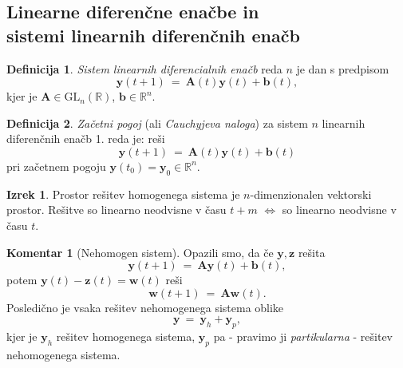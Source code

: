 \documentclass[11pt]{article}
\newcommand{\R}{\mathbb{R}}
\renewcommand{\b}{\mathbf{b}}
\newcommand{\y}{\mathbf{y}}
\newcommand{\z}{\mathbf{z}}
\newcommand{\w}{\mathbf{w}}
\newcommand{\A}{\mathbf{A}}
\newcommand{\glnr}{\text{GL}_n(\R)}
\newcommand{\0}{\mathbf{0}}
\theoremstyle{definition}
\newtheorem{definicija}{Definicija}[section]
\theoremstyle{definition}
\theoremstyle{definition}
\newtheorem{izrek}{Izrek}[section]
\theoremstyle{definition}
\newtheorem*{komentar}{Komentar}
\begin{document}

\subsection{Linearne diferenčne enačbe in \\sistemi linearnih diferenčnih enačb}
\vspace{0.5cm}

\begin{definicija}

\textit{Sistem linearnih diferencialnih enačb} reda $n$ je dan s predpisom
$$\y(t+1) ~=~ \A(t)\y(t) + \b(t),$$
kjer je $\A \in \glnr$, $\b \in \R^n$. 

\end{definicija}
\vspace{0.5cm}

\begin{definicija}

\textit{Začetni pogoj} (ali \textit{Cauchyjeva naloga}) za sistem $n$ linearnih diferenčnih enačb 1. reda je: reši 
$$\y(t+1) ~=~ \A(t)\y(t) + \b(t)$$
pri začetnem pogoju $\y(t_0) = \y_0 \in \R^n$.

\end{definicija}
\vspace{0.5cm}

\begin{izrek}

Prostor rešitev homogenega sistema je $n$-dimenzionalen vektorski prostor. Rešitve so linearno neodvisne v času $t+m$ $\iff$ so linearno neodvisne v času $t$.

\end{izrek}
\vspace{0.5cm}

\begin{komentar}[Nehomogen sistem]

Opazili smo, da če $\y,\z$ rešita
$$\y(t+1) ~=~ \A\y(t) + \b(t),$$
potem $\y(t) - \z(t) = \w(t)$ reši
$$\w(t+1) ~=~ \A\w(t).$$
Posledično je vsaka rešitev nehomogenega sistema oblike 
$$\y ~=~ \y_h + \y_p,$$
kjer je $\y_h$ rešitev homogenega sistema, $\y_p$ pa - pravimo ji \textit{partikularna} - rešitev nehomogenega sistema.

\end{komentar}
\vspace{0.5cm}
\end{document}

